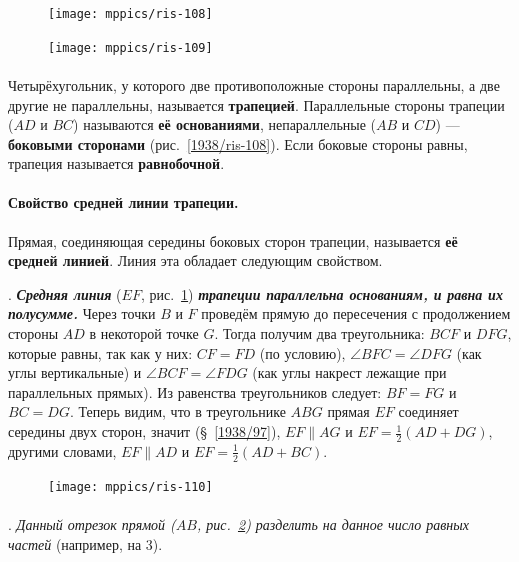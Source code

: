 \documentclass[oneside]{book}
\begin{document}
\begin{figure}
\vskip-8mm
\centering
\texttt{[image: mppics/ris-108]}
\caption{}\label{1938/ris-108}
\bigskip
\texttt{[image: mppics/ris-109]}
\caption{}\label{1938/ris-109}
\end{figure}

\paragraph{}\label{1938/98}
Четырёхугольник, у которого две противоположные стороны параллельны, а две другие не параллельны, называется \textbf{трапецией}.
Параллельные стороны трапеции ($AD$ и $BC$) называются \textbf{её основаниями}, непараллельные ($AB$ и $CD$) — \textbf{боковыми сторонами} (рис.~\ref{1938/ris-108}).
Если боковые стороны равны, трапеция называется \textbf{равнобочной}.

\paragraph{Свойство средней линии трапеции.}\label{1938/99}
Прямая, соединяющая середины боковых сторон трапеции, называется \textbf{её средней линией}.
Линия эта обладает следующим свойством.

\mbox{.}
\textbf{\emph{Средняя линия}} ($EF$, рис.~\ref{1938/ris-109}) \textbf{\emph{трапеции параллельна основаниям, и равна их полусумме.}}
Через точки $B$ и $F$ проведём прямую до пересечения с продолжением стороны $AD$ в некоторой точке $G$.
Тогда получим два треугольника:
$BCF$ и $DFG$, которые равны, так как у них:
$CF=FD$ (по условию), $\angle BFC=\angle DFG$ (как углы вертикальные) и $\angle BCF = \angle FDG$ (как углы накрест лежащие при параллельных прямых).
Из равенства треугольников следует:
$BF=FG$ и $BC=DG$.
Теперь видим, что в треугольнике $ABG$ прямая $EF$ соединяет середины двух сторон, значит (§~\ref{1938/97}), $EF \parallel AG$ и $EF = \tfrac12(AD+DG)$, другими словами, $EF\parallel AD$ и $EF = \tfrac12(AD + BC)$.


\begin{figure}
\centering
\texttt{[image: mppics/ris-110]}
\caption{}\label{1938/ris-110}
\end{figure}

\paragraph{}\label{1938/100}
\mbox{.}
\emph{Данный отрезок прямой \emph{($AB$, рис.~\ref{1938/ris-110})} разделить на данное число равных частей} (например, на 3).
\end{document}
